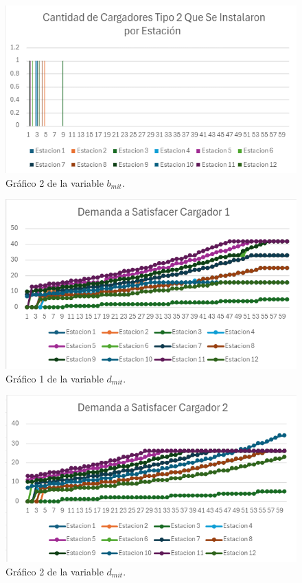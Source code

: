 \documentclass[letterpaper]{article}
\begin{document}
\begin{flushleft}
		\begin{figure}[htbp]
			\centering
			\includegraphics[scale=0.9]{imagenes/bmit2.png}
			\caption{Gráfico 2 de la variable $b_{mit}$.}
			\label{fig:grafica-bmit2}
		\end{figure}

		\begin{figure}[htbp]
			\centering
			\includegraphics[scale=0.6]{imagenes/dmit1.png}
			\caption{Gráfico 1 de la variable $d_{mit}$.}
			\label{fig:grafica-dmit1}
		\end{figure}

		\begin{figure}[htbp]
			\centering
			\includegraphics[scale=0.6]{imagenes/dmit2.png}
			\caption{Gráfico 2 de la variable $d_{mit}$.}
			\label{fig:grafica-dmit2}
		\end{figure}


\end{flushleft}
\end{document}
